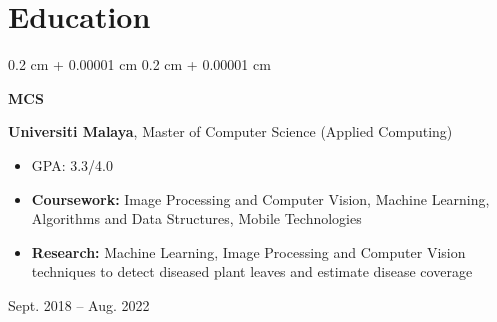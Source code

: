 \documentclass[10pt, letterpaper]{article}
\newenvironment{highlights}{
    \begin{itemize}[
        topsep=0.10 cm,
        parsep=0.10 cm,
        partopsep=0pt,
        itemsep=0pt,
        leftmargin=0.4 cm + 10pt
    ]
}{
    \end{itemize}
} %
\newenvironment{highlightsforbulletentries}{
    \begin{itemize}[
        topsep=0.10 cm,
        parsep=0.10 cm,
        partopsep=0pt,
        itemsep=0pt,
        leftmargin=10pt
    ]
}{
    \end{itemize}
} %
\newenvironment{onecolentry}{
    \begin{adjustwidth}{
        0.2 cm + 0.00001 cm
    }{
        0.2 cm + 0.00001 cm
    }
}{
    \end{adjustwidth}
} %
\newenvironment{threecolentry}[3][]{
    \onecolentry
    \def\thirdColumn{#3}
    \setcolumnwidth{1 cm, \fill, 4.5 cm}
    \begin{paracol}{3}
    {\raggedright #2} \switchcolumn
}{
    \switchcolumn \raggedleft \thirdColumn
    \end{paracol}
    \endonecolentry
} %
\let\hrefWithoutArrow\href
\renewcommand{\href}[2]{\hrefWithoutArrow{#1}{\ifthenelse{\equal{#2}{}}{ }{#2 }\raisebox{.15ex}{\footnotesize \faExternalLink*}}}
\begin{document}



    










    \section{Education}
        
        \begin{threecolentry}{\textbf{MCS}}{
            Sept. 2018 – Aug. 2022
        }
            \textbf{Universiti Malaya}, Master of Computer Science (Applied Computing)
            \begin{highlights}
                \item GPA: 3.3/4.0
                \item \textbf{Coursework:} Image Processing and Computer Vision, Machine Learning, Algorithms and Data Structures, Mobile Technologies
                \item \textbf{Research:} Machine Learning, Image Processing and Computer Vision techniques to detect diseased plant leaves and 
                    estimate disease coverage
            \end{highlights}
        \end{threecolentry}
\end{document}
